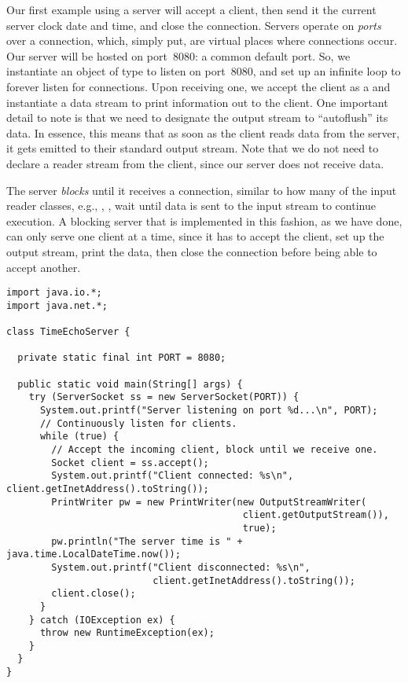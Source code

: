 Our first example using a server will accept a client, then send it the current server clock date and time, and close the connection. 
Servers operate on \emph{ports} over a connection, which, simply put, are virtual places where connections occur. 
Our server will be hosted on port~$8080$: a common default port. 
So, we instantiate an object of type  to listen on port~$8080$, and set up an infinite loop to forever listen for connections. 
Upon receiving one, we accept the client as a  and instantiate a data stream to print information out to the client. 
One important detail to note is that we need to designate the  output stream to ``autoflush'' its data. 
In essence, this means that as soon as the client reads data from the server, it gets emitted to their standard output stream. 
Note that we do not need to declare a reader stream from the client, since our server does not receive data.

The server \emph{blocks} until it receives a connection, similar to how many of the input reader classes, e.g., , , wait until data is sent to the input stream to continue execution. 
A blocking server that is implemented in this fashion, as we have done, can only serve one client at a time, since it has to accept the client, set up the output stream, print the data, then close the connection before being able to accept another.

\begin{lstlisting}[language=MyJava]
import java.io.*;
import java.net.*;

class TimeEchoServer {

  private static final int PORT = 8080;

  public static void main(String[] args) {
    try (ServerSocket ss = new ServerSocket(PORT)) {
      System.out.printf("Server listening on port %d...\n", PORT);
      // Continuously listen for clients.
      while (true) {
        // Accept the incoming client, block until we receive one.
        Socket client = ss.accept();
        System.out.printf("Client connected: %s\n", client.getInetAddress().toString());
        PrintWriter pw = new PrintWriter(new OutputStreamWriter(
                                          client.getOutputStream()), 
                                          true);
        pw.println("The server time is " + java.time.LocalDateTime.now());
        System.out.printf("Client disconnected: %s\n", 
                          client.getInetAddress().toString());
        client.close();
      }
    } catch (IOException ex) { 
      throw new RuntimeException(ex);
    }
  }
}
\end{lstlisting}

